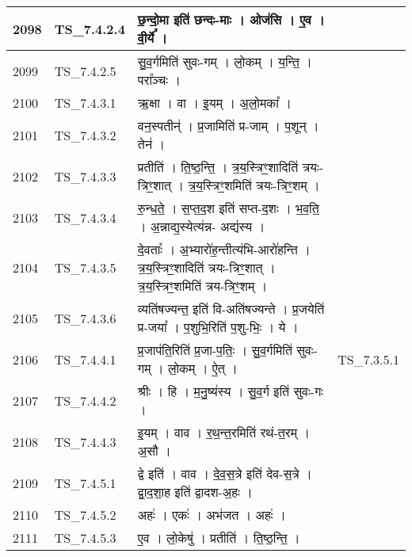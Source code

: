 \documentclass[17pt]{extarticle}
\begin{document}
\begin{longtable}{||p{0.4in}||p{0.9in}||p{4.0in}||p{0.9in}||}
        \hline
            2098 & TS\_7.4.2.4 & छ॒न्दो॒मा इति॑ छन्दः{-}माः   ।   ओज॑सि   ।   ए॒व   ।   वी॒र्ये᳚   ।    &      \\
        \hline
            2099 & TS\_7.4.2.5 & सु॒व॒र्गमिति॑ सुवः{-}गम्   ।   लो॒कम्   ।   य॒न्ति॒   ।   परा᳚ञ्चः   ।    &      \\
        \hline
            2100 & TS\_7.4.3.1 & ऋ॒क्षा   ।   वा   ।   इ॒यम्   ।   अ॒लो॒मका᳚   ।    &      \\
        \hline
            2101 & TS\_7.4.3.2 & वन॒स्पतीन्॑   ।   प्र॒जामिति॑ प्र{-}जाम्   ।   प॒शून्   ।   तेन॑   ।    &      \\
        \hline
            2102 & TS\_7.4.3.3 & प्रतीति॑   ।   ति॒ष्ठ॒न्ति॒   ।   त्र॒य॒स्त्रिꣳ॒॒शादिति॑ त्रयः{-}त्रिꣳ॒॒शात्   ।   त्र॒य॒स्त्रिꣳ॒॒शमिति॑ त्रयः{-}त्रिꣳ॒॒शम्   ।    &      \\
        \hline
            2103 & TS\_7.4.3.4 & रु॒न्ध॒ते॒   ।   स॒प्त॒द॒श इति॑ सप्त{-}द॒शः   ।   भ॒व॒ति॒   ।   अ॒न्नाद्य॒स्येत्य॑न्न{-} अद्य॑स्य   ।    &      \\
        \hline
            2104 & TS\_7.4.3.5 & दे॒वताः᳚   ।   अ॒भ्यारो॑ह॒न्तीत्य॑भि{-}आरो॑हन्ति   ।   त्र॒य॒स्त्रिꣳ॒॒शादिति॑ त्रयः{-}त्रिꣳ॒॒शात्   ।   त्र॒य॒स्त्रिꣳ॒॒शमिति॑ त्रय{-}त्रिꣳ॒॒शम्   ।    &      \\
        \hline
            2105 & TS\_7.4.3.6 & व्यति॑षज्यन्त॒ इति॑ वि{-}अति॑षज्यन्ते   ।   प्र॒जयेति॑ प्र{-}जया᳚   ।   प॒शुभि॒रिति॑ प॒शु{-}भिः॒   ।   ये   ।    &      \\
        \hline
            2106 & TS\_7.4.4.1 & प्र॒जाप॑ति॒रिति॑ प्र॒जा{-}प॒तिः॒   ।   सु॒व॒र्गमिति॑ सुवः{-}गम्   ।   लो॒कम्   ।   ऐ॒त्   ।    & TS\_7.3.5.1        \\
        \hline
            2107 & TS\_7.4.4.2 & श्रीः   ।   हि   ।   म॒नु॒ष्य॑स्य   ।   सु॒व॒र्ग इति॑ सुवः{-}गः   ।    &      \\
        \hline
            2108 & TS\_7.4.4.3 & इ॒यम्   ।   वाव   ।   र॒थ॒न्त॒रमिति॑ रथं{-}त॒रम्   ।   अ॒सौ   ।    &      \\
        \hline
            2109 & TS\_7.4.5.1 & द्वे इति॑   ।   वाव   ।   दे॒व॒स॒त्रे इति॑ देव{-}स॒त्रे   ।   द्वा॒द॒शा॒ह इति॑ द्वादश{-}अ॒हः   ।    &      \\
        \hline
            2110 & TS\_7.4.5.2 & अहः॑   ।   एकः॑   ।   अभ॑जत   ।   अहः॑   ।    &      \\
        \hline
            2111 & TS\_7.4.5.3 & ए॒व   ।   लो॒केषु॑   ।   प्रतीति॑   ।   ति॒ष्ठ॒न्ति॒   ।    &      \\
        \hline

\end{longtable}
\end{document}
